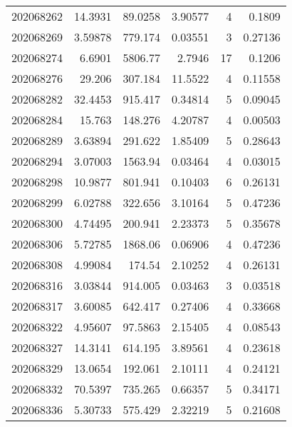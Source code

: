 \begin{tabular}{rrrrrr}
 202068262 &         14.3931  &       89.0258 &            3.90577 &           4 & 0.1809  \\
 202068269 &          3.59878 &      779.174  &            0.03551 &           3 & 0.27136 \\
 202068274 &          6.6901  &     5806.77   &            2.7946  &          17 & 0.1206  \\
 202068276 &         29.206   &      307.184  &           11.5522  &           4 & 0.11558 \\
 202068282 &         32.4453  &      915.417  &            0.34814 &           5 & 0.09045 \\
 202068284 &         15.763   &      148.276  &            4.20787 &           4 & 0.00503 \\
 202068289 &          3.63894 &      291.622  &            1.85409 &           5 & 0.28643 \\
 202068294 &          3.07003 &     1563.94   &            0.03464 &           4 & 0.03015 \\
 202068298 &         10.9877  &      801.941  &            0.10403 &           6 & 0.26131 \\
 202068299 &          6.02788 &      322.656  &            3.10164 &           5 & 0.47236 \\
 202068300 &          4.74495 &      200.941  &            2.23373 &           5 & 0.35678 \\
 202068306 &          5.72785 &     1868.06   &            0.06906 &           4 & 0.47236 \\
 202068308 &          4.99084 &      174.54   &            2.10252 &           4 & 0.26131 \\
 202068316 &          3.03844 &      914.005  &            0.03463 &           3 & 0.03518 \\
 202068317 &          3.60085 &      642.417  &            0.27406 &           4 & 0.33668 \\
 202068322 &          4.95607 &       97.5863 &            2.15405 &           4 & 0.08543 \\
 202068327 &         14.3141  &      614.195  &            3.89561 &           4 & 0.23618 \\
 202068329 &         13.0654  &      192.061  &            2.10111 &           4 & 0.24121 \\
 202068332 &         70.5397  &      735.265  &            0.66357 &           5 & 0.34171 \\
 202068336 &          5.30733 &      575.429  &            2.32219 &           5 & 0.21608 \\

\end{tabular}
